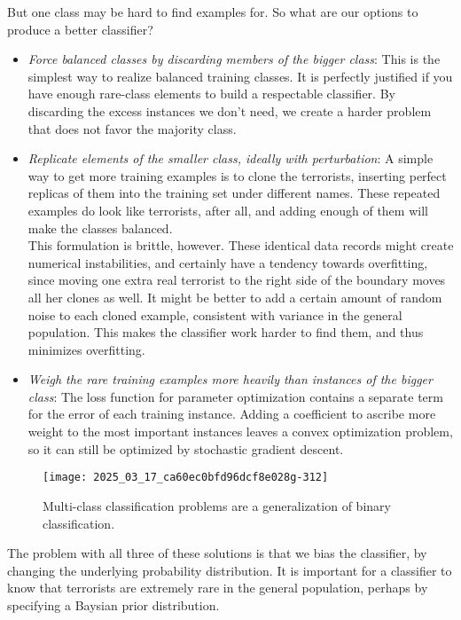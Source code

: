 \documentclass[10pt]{article}
\begin{document}
But one class may be hard to find examples for. So what are our options to produce a better classifier?
\begin{itemize}
  \item \textit{Force balanced classes by discarding members of the bigger class}: This is the simplest way to realize balanced training classes. It is perfectly justified if you have enough rare-class elements to build a respectable classifier. By discarding the excess instances we don't need, we create a harder problem that does not favor the majority class.
  \item \textit{Replicate elements of the smaller class, ideally with perturbation}: A simple way to get more training examples is to clone the terrorists, inserting perfect replicas of them into the training set under different names. These repeated examples do look like terrorists, after all, and adding enough of them will make the classes balanced.\\
This formulation is brittle, however. These identical data records might create numerical instabilities, and certainly have a tendency towards overfitting, since moving one extra real terrorist to the right side of the boundary moves all her clones as well. It might be better to add a certain amount of random noise to each cloned example, consistent with variance in the general population. This makes the classifier work harder to find them, and thus minimizes overfitting.
  \item \textit{Weigh the rare training examples more heavily than instances of the bigger class}: The loss function for parameter optimization contains a separate term for the error of each training instance. Adding a coefficient to ascribe more weight to the most important instances leaves a convex optimization problem, so it can still be optimized by stochastic gradient descent.\\
\end{itemize}

\begin{figure}[h]
    \centering
    \texttt{[image: 2025\_03\_17\_ca60ec0bfd96dcf8e028g-312]}
    \caption{Multi-class classification problems are a generalization of binary classification.}
\end{figure}

The problem with all three of these solutions is that we bias the classifier, by changing the underlying probability distribution. It is important for a classifier to know that terrorists are extremely rare in the general population, perhaps by specifying a Baysian prior distribution.
\end{document}

